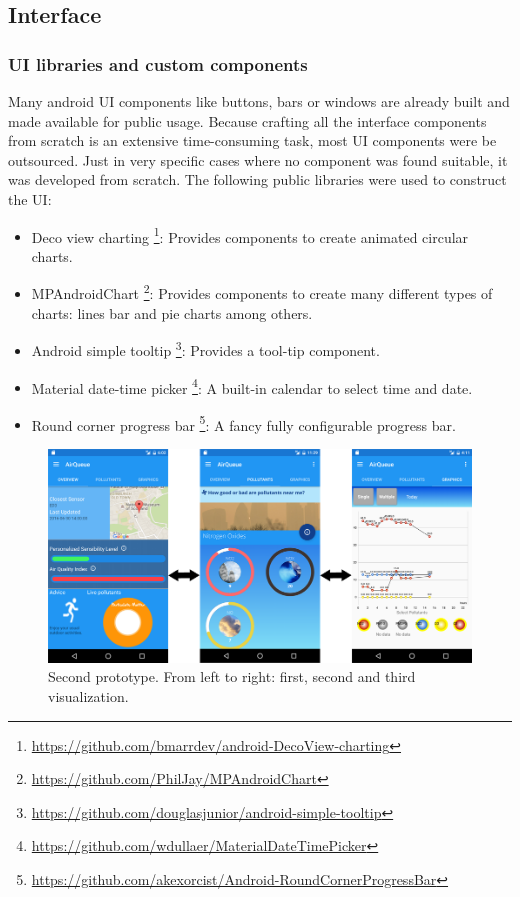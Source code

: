 \subsection{Interface}
\subsubsection{UI libraries and custom components}
Many android UI components like buttons, bars or windows are already built and made available for public usage. Because crafting all the interface components from scratch is an extensive time-consuming task, most UI components were be outsourced. Just in very specific cases where no component was found suitable, it was developed from scratch. 
The following public libraries were used to construct the UI:
\begin{itemize}
    \item Deco view charting \footnote{\url{https://github.com/bmarrdev/android-DecoView-charting}}: Provides components to create animated circular charts.
    \item MPAndroidChart \footnote{\url{https://github.com/PhilJay/MPAndroidChart}}: Provides components to create many different types of charts: lines bar and pie charts among others.
    \item Android simple tooltip \footnote{\url{https://github.com/douglasjunior/android-simple-tooltip}}: Provides a tool-tip component.
	\item Material date-time picker \footnote{\url{https://github.com/wdullaer/MaterialDateTimePicker}}: A built-in calendar to select time and date.
  \item Round corner progress bar \footnote{\url{https://github.com/akexorcist/Android-RoundCornerProgressBar}}: A fancy fully configurable progress bar.
\end{itemize}

\begin{figure}[H]
\begin{adjustbox}{width=1.2\textwidth,center=\textwidth}
  \centering
  \includegraphics[scale=1]{images/secondPrototype.png}
\end{adjustbox}
  \caption[Second prototype]{Second prototype. From left to right: first, second and third visualization.}
  \label{fig:first_second_prototype}
\end{figure}


